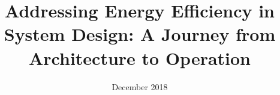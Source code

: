 \documentclass[a4paper, twoside, 11pt, hidelinks]{Thesis}  %
\begin{document}
\frontmatter      %

\title  {Addressing Energy Efficiency in System Design: A Journey from Architecture to Operation}
\addresses  {\groupname\\\deptname\\\univname}  %
\date       {December 2018}
\subject    {}
\keywords   {}

\maketitle

\pagestyle{plain}  %

\cleardoublepage
\end{document}
